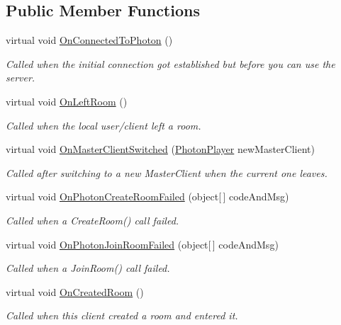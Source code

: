 \subsection*{Public Member Functions}
\begin{DoxyCompactItemize}
\item 
virtual void \hyperlink{class_photon_1_1_pun_behaviour_addc4f79164cd22c37d330b5ee2e340c7}{On\+Connected\+To\+Photon} ()
\begin{DoxyCompactList}\small\item\em Called when the initial connection got established but before you can use the server. \end{DoxyCompactList}\item 
virtual void \hyperlink{class_photon_1_1_pun_behaviour_a4e9e2aebcfa279a2eec0020f0e44b57a}{On\+Left\+Room} ()
\begin{DoxyCompactList}\small\item\em Called when the local user/client left a room. \end{DoxyCompactList}\item 
virtual void \hyperlink{class_photon_1_1_pun_behaviour_a53833ef0f9be9906694fc600acc1b897}{On\+Master\+Client\+Switched} (\hyperlink{class_photon_player}{Photon\+Player} new\+Master\+Client)
\begin{DoxyCompactList}\small\item\em Called after switching to a new Master\+Client when the current one leaves. \end{DoxyCompactList}\item 
virtual void \hyperlink{class_photon_1_1_pun_behaviour_a9fb00e512c59fa60c0a95e0d6e4dbe89}{On\+Photon\+Create\+Room\+Failed} (object\mbox{[}$\,$\mbox{]} code\+And\+Msg)
\begin{DoxyCompactList}\small\item\em Called when a Create\+Room() call failed. \end{DoxyCompactList}\item 
virtual void \hyperlink{class_photon_1_1_pun_behaviour_ac808cb2ed21bbbe52a0d33f4d927644e}{On\+Photon\+Join\+Room\+Failed} (object\mbox{[}$\,$\mbox{]} code\+And\+Msg)
\begin{DoxyCompactList}\small\item\em Called when a Join\+Room() call failed. \end{DoxyCompactList}\item 
virtual void \hyperlink{class_photon_1_1_pun_behaviour_a67049b5cdc50467f4790aca093c34e82}{On\+Created\+Room} ()
\begin{DoxyCompactList}\small\item\em Called when this client created a room and entered it. \end{DoxyCompactList}\item 

\end{DoxyCompactItemize}
